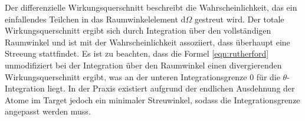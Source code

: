 Der differenzielle Wirkungsquerschnitt beschreibt die Wahrscheinlichkeit, das ein einfallendes Teilchen in das Raumwinkelelement $\mathrm{d} \Omega$ gestreut wird. Der totale Wirkungsquerschnitt ergibt sich durch Integration über den vollständigen Raumwinkel und ist mit der Wahrscheinlichkeit assoziiert, dass überhaupt eine Streeung stattfindet. Es ist zu beachten, dass die Formel \eqref{eqn:rutherford} unmodifiziert bei der Integration über den Raumwinkel einen divergierenden Wirkungsquerschnitt ergibt, was an der unteren Integrationsgrenze $0$ für die $\theta$-Integration liegt. In der Praxis existiert aufgrund der endlichen Ausdehnung der Atome im Target jedoch ein minimaler Streuwinkel, sodass die Integrationsgrenze angepasst werden muss.

